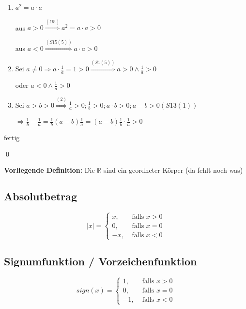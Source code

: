 \documentclass[fleqn]{scrbook}
\newcommand{\R}{\mathbb{R}}
\renewenvironment{proof}{{\bfseries Beweis }}{\qed}
\begin{document}
\begin{proof}

\begin{enumerate}
  \item $a^2=a \cdot a$
  
    aus $a>0 \stackrel{(O5)}{\Longrightarrow} a^2=a \cdot a>0$ 
    
    aus $a<0 \stackrel{(S15(5))}{\Longrightarrow} a \cdot a>0$
    
  \item Sei $a \neq 0 \Longrightarrow a \cdot \frac{1}{a} = 1 > 0 \stackrel{(S1(5))}{\Longrightarrow} a>0 \wedge \frac{1}{a}>0$
  
    oder $a<0 \wedge \frac{1}{a}>0$
    
  \item Sei $a>b>0 \stackrel{(2)}{\Longrightarrow} \frac{1}{a}>0;\frac{1}{b}>0;a \cdot b>0;a-b>0 (S13(1))$
  
  $\Longrightarrow \frac{1}{b} - \frac{1}{a} = \frac{1}{b}(a-b)\frac{1}{a}=(a-b)\frac{1}{b} \cdot \frac{1}{a}>0$
\end{enumerate}

fertig

\end{proof}

\textbf{Vorliegende Definition:} Die $\R$ sind ein geordneter Körper (da fehlt noch was)

\subsection{Absolutbetrag}

\[
  |x| = \left\{ 
    \begin{array}{rl}
       x, & \text{ falls } x>0 \\
       0, & \text{ falls } x=0\\
      -x, & \text{ falls } x<0
    \end{array}\right.
\]

\subsection{Signumfunktion / Vorzeichenfunktion}

\[
  sign(x) = \left\{ 
    \begin{array}{rl}
       1, & \text{ falls } x>0 \\
       0, & \text{ falls } x=0\\
      -1, & \text{ falls } x<0
    \end{array}\right.
\]
\end{document}
